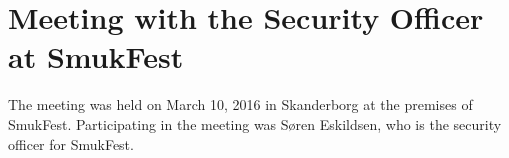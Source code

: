 \section{Meeting with the Security Officer at SmukFest}
\label{app:smukfest_security_officer}
The meeting was held on March 10, 2016 in Skanderborg at the premises of SmukFest. Participating in the meeting was Søren Eskildsen, who is the security officer for SmukFest.
 
